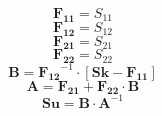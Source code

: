 \[ \mathbf{F_{11}} = S_{11} \]
\[ \mathbf{F_{12}} = S_{12} \]
\[ \mathbf{F_{21}} = S_{21} \]
\[ \mathbf{F_{22}} = S_{22} \]
\[ \mathbf{B}=\mathbf{F_{12}}^{-1}\cdot\left[ \mathbf{Sk} -
\mathbf{F_{11}} \right]  \]
\[ \mathbf{A}=\mathbf{F_{21}}+ \mathbf{F_{22}}\cdot\mathbf{B} \]
\[ \mathbf{Su} = \mathbf{B} \cdot \mathbf{A}^{-1} \]
